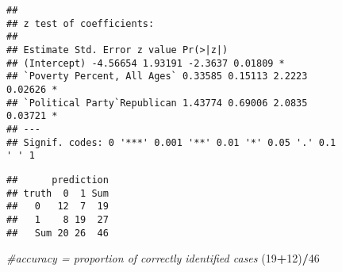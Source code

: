 \documentclass[]{article}
\newenvironment{Shaded}{\begin{snugshade}}{\end{snugshade}}
\newcommand{\CommentTok}[1]{\textcolor[rgb]{0.56,0.35,0.01}{\textit{#1}}}
\newcommand{\DataTypeTok}[1]{\textcolor[rgb]{0.13,0.29,0.53}{#1}}
\newcommand{\DecValTok}[1]{\textcolor[rgb]{0.00,0.00,0.81}{#1}}
\newcommand{\KeywordTok}[1]{\textcolor[rgb]{0.13,0.29,0.53}{\textbf{#1}}}
\newcommand{\NormalTok}[1]{#1}
\newcommand{\OperatorTok}[1]{\textcolor[rgb]{0.81,0.36,0.00}{\textbf{#1}}}
\newcommand{\StringTok}[1]{\textcolor[rgb]{0.31,0.60,0.02}{#1}}
\begin{document}
\begin{Shaded}
\end{Shaded}

\begin{verbatim}
##
## z test of coefficients:
##
## Estimate Std. Error z value Pr(>|z|)
## (Intercept) -4.56654 1.93191 -2.3637 0.01809 *
## `Poverty Percent, All Ages` 0.33585 0.15113 2.2223
0.02626 *
## `Political Party`Republican 1.43774 0.69006 2.0835
0.03721 *
## ---
## Signif. codes: 0 '***' 0.001 '**' 0.01 '*' 0.05 '.' 0.1
' ' 1
\end{verbatim}

\begin{Shaded}
\end{Shaded}

\begin{verbatim}
##      prediction
## truth  0  1 Sum
##   0   12  7  19
##   1    8 19  27
##   Sum 20 26  46
\end{verbatim}

\begin{Shaded}
\begin{Highlighting}[]
\CommentTok{#accuracy = proportion of correctly identified cases}
\NormalTok{(}\DecValTok{19}\OperatorTok{+}\DecValTok{12}\NormalTok{)}\OperatorTok{/}\DecValTok{46}
\end{Highlighting}
\end{Shaded}
\end{document}
